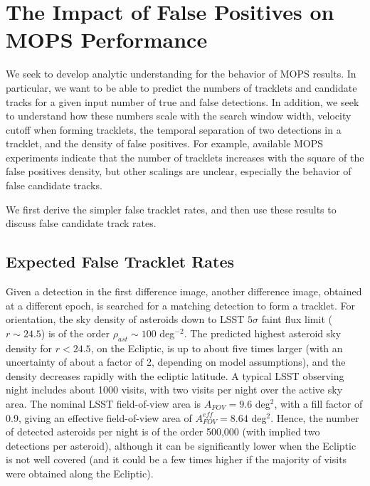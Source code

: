 \section{The Impact of False Positives on MOPS Performance \label{sec:appMOPS}} 


We seek to develop analytic understanding for the behavior of MOPS results. 
In particular, we want to be able to predict the numbers of tracklets and 
candidate tracks for a given input number of true and false detections. In addition, we seek
to understand how these numbers scale with the search window width, 
velocity cutoff when forming tracklets, the temporal separation of two 
detections in a tracklet, and the density of false positives. For example, available
MOPS experiments indicate that the number of tracklets increases with 
the square of the false positives density, but other scalings are unclear, 
especially the behavior of false candidate tracks. 

We first derive the simpler false tracklet rates, and then use these results to 
discuss false candidate track rates. 


\subsection{Expected False Tracklet Rates \label{sec:tracklets} }

Given a detection in the first difference image,  another difference image, obtained at a different epoch, 
is searched for a matching detection to form a tracklet. For orientation, 
the sky density of asteroids down to LSST $5\sigma$ faint flux limit ($r \sim 24.5$) is of the order 
$\rho_{ast} \sim 100$ deg$^{-2}$. The predicted highest asteroid sky density for $r<24.5$, 
on the Ecliptic, is up to about five times larger (with an uncertainty of about a factor of 2, 
depending on model assumptions), and the density decreases rapidly with the ecliptic latitude. 
A typical LSST observing night includes about 1000 visits, with two visits per night over 
the active sky area. The nominal LSST field-of-view area is $A_{FOV}=9.6$ deg$^2$, with a 
fill factor of 0.9, giving an effective field-of-view area of $A_{FOV}^{eff}=8.64$ deg$^2$. Hence, 
the number of detected asteroids per night is of the order 500,000 (with implied two detections 
per asteroid), although it can be significantly lower when the Ecliptic is not well covered (and 
it could be a few times higher if the majority of visits were obtained along the Ecliptic). 

